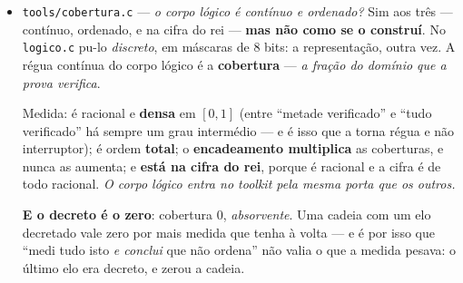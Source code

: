 \documentclass[11pt]{article}
\newcommand{\code}[1]{\texttt{\small #1}}
\newcommand{\Q}{\mathbb Q}
\theoremstyle{plain}
\theoremstyle{remark}
\begin{document}
\begin{itemize}
O corpo, pelo contrato: $\oplus$ a \textbf{disjunção} (basta uma prova), $\otimes$ o
\textbf{encadeamento} ($A{\to}B$ com $B{\to}C$ dá $A{\to}C$, associativo), $\nu$ a
\textbf{contraposição} --- e ela é \emph{involução}, medida em $65\,536$ proposições: a mesma
assinatura de todos os outros $\nu$ deste trabalho, não uma analogia.

\textbf{Tentou-se por sete métodos, e as sete falharam --- cada uma pela sua razão}, o que importa,
porque falharem todas do mesmo modo seria sinal de se estar a testar mal: \emph{contraexemplo}
(procurado em $160\,000$ pares, zero); \emph{exaustão} (infinitos elementos); \emph{contradição}
(nada de falso saiu); \emph{contraposição} ($\Q$ é corpo \emph{e} ordenado); \emph{indução} (não há
cadeia); \emph{diagonal} (não se aplica); \emph{redução} (reduz a $\Q$, que ordena).

\textbf{O único que conclui é o decreto --- e ele denuncia-se por ser o seu próprio dual:} não tem
hipótese a virar. Medido: só o decreto tem $\nu(x) = x$ com hipótese vazia, e engole qualquer
hipótese ao encadear. \emph{Era por aí que se passava quando dizia ``não é ordenável, logo
recusa''.}

E o espelho diz uma coisa só: as cinco vezes que errei hoje foram \textbf{o mesmo movimento} ---
passar do que \emph{medi} para o que \emph{decretei} sem notar a fronteira. \emph{Operador aplica
o método e reporta, inclusive ``não consegui''; juiz conclui sem método.} A diferença não é de tom
--- é estrutural, e mede-se: \textbf{o decreto é o único sem dual}.
\item \code{tools/cobertura.c} --- \emph{o corpo lógico é contínuo e ordenado?} Sim aos três
--- contínuo, ordenado, e na cifra do rei --- \textbf{mas não como se o construí}. No
\code{logico.c} pu-lo \emph{discreto}, em máscaras de $8$ bits: a representação, outra vez. A régua
contínua do corpo lógico é a \textbf{cobertura} --- \emph{a fração do domínio que a prova verifica}.

Medida: é racional e \textbf{densa} em $[0,1]$ (entre ``metade verificado'' e ``tudo verificado'' há
sempre um grau intermédio --- e é isso que a torna régua e não interruptor); é ordem \textbf{total};
o \textbf{encadeamento multiplica} as coberturas, e nunca as aumenta; e \textbf{está na cifra do
rei}, porque é racional e a cifra é de todo racional. \emph{O corpo lógico entra no toolkit pela
mesma porta que os outros.}

\textbf{E o decreto é o zero}: cobertura $0$, \emph{absorvente}. Uma cadeia com um elo decretado
vale zero por mais medida que tenha à volta --- e é por isso que ``medi tudo isto \emph{e conclui}
que não ordena'' não valia o que a medida pesava: o último elo era decreto, e zerou a cadeia.


\end{itemize}
\end{document}
